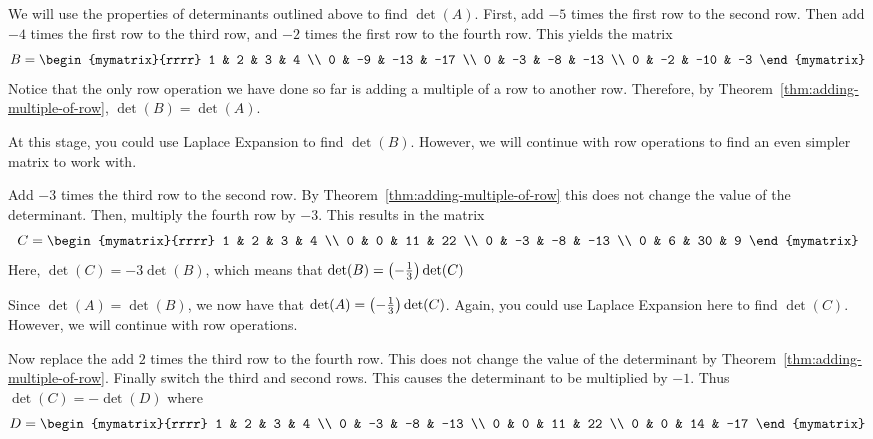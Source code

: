 \begin{solution}
We will use the properties of determinants outlined above to find $\det (A)$. First, add $-5$ times the first row to the second row. Then add $-4$ times the first row to the third row, and $-2$ times
the first row to the fourth row. This yields the matrix
\begin{equation*}
B=\begin{mymatrix}{rrrr}
1 & 2 & 3 & 4 \\
0 & -9 & -13 & -17 \\
0 & -3 & -8 & -13 \\
0 & -2 & -10 & -3
\end{mymatrix}
\end{equation*}
Notice that the only row operation we have done so far is adding a multiple 
of a row to another row. Therefore, by Theorem~\ref{thm:adding-multiple-of-row}, $\det (B) = \det (A)$. 

At this stage, you could use Laplace Expansion to find $\det (B)$. However, we will continue with row operations 
to find an even simpler matrix to work with.

Add $-3$ times the third row to the second row. By Theorem~\ref{thm:adding-multiple-of-row} this does not change the value of
the determinant. Then, multiply the fourth row by $-3$. This results in the matrix
\begin{equation*}
C=\begin{mymatrix}{rrrr}
1 & 2 & 3 & 4 \\
0 & 0 & 11 & 22 \\
0 & -3 & -8 & -13 \\
0 & 6 & 30 & 9
\end{mymatrix} 
\end{equation*}
Here, $\det (C) = -3 \det (B)$, which means that 
$\det (B) =\left(-\frac{1}{3}\right) \det (C) $

Since $\det (A) = \det (B)$, we now have that 
$\det (A) = \left(-\frac{1}{3}\right) \det (C)$. Again, you could use Laplace Expansion here to find $\det (C)$. However,
we will continue with row operations.

Now replace the add $2$ times the third row to the fourth row. This does not change the
value of the determinant by Theorem~\ref{thm:adding-multiple-of-row}. Finally switch the third
and second rows. This causes the determinant to be multiplied by $-1$. Thus $\det (C) = -\det (D) $ where
\begin{equation*}
D=\begin{mymatrix}{rrrr}
1 & 2 & 3 & 4 \\
0 & -3 & -8 & -13 \\
0 & 0 & 11 & 22 \\
0 & 0 & 14 & -17
\end{mymatrix}
\end{equation*}


\end{solution}
